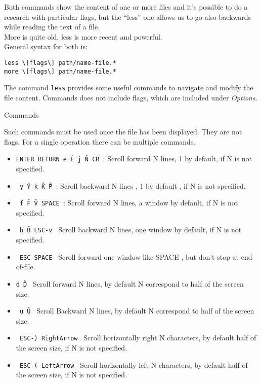 \documentclass[hidelinks,12pt,a4paper,numbers=enddot]{scrartcl}
\begin{document}
Both commands show the content of one or more files and it’s possible to do a research with
particular flags, but the “less” one allows us to go also backwards while reading the text
of a file.\\
More is quite old, less is more recent and powerful.\\

General syntax for both is:


\begin{verbatim}
less \[flags\] path/name-file.*
more \[flags\] path/name-file.*
\end{verbatim}



The command \texttt{less} provides some useful commands to navigate and modify the file content.
Commands does not include flags, which are included under \emph{Options}.


Commands



Such commands must be used once the file has been displayed.
They are not flags. For a single operation there can be multiple commands.


\begin{itemize}
    \item \texttt{ENTER  RETURN e  \^E  j  \^N  CR }:
        Scroll forward N lines, 1 by default, if N is not specified.
    \item \texttt{ y  \^Y  k  \^K  \^P }:
        Scroll backward N lines , 1 by default , if N is not specified.
    \item \texttt{ f  \^F  \^V  SPACE }:
        Scroll forward  N lines, a window by default, if N is not specified.
    \item \texttt{ b  \^B  ESC-v }
        Scroll backward N lines, one window by default, if N is not specified.
    \item \texttt{ ESC-SPACE }
        Scroll forward  one window like SPACE , but don't stop at end-of-file.
    \item \texttt{d  \^D }
        Scroll forward  N lines, by default N correspond to half of the screen size.
    \item \texttt{ u  \^U }
        Scroll Backward  N lines, by default N correspond to half of the screen size.
    \item \texttt{ ESC-)  RightArrow }
        Scroll horizontally right  N characters, by default half of the screen size, if N is not specified.
    \item \texttt{ ESC-(  LeftArrow }
        Scroll horizontally left  N characters, by default half of the screen size, if N is not specified. 
\end{itemize}
\end{document}
